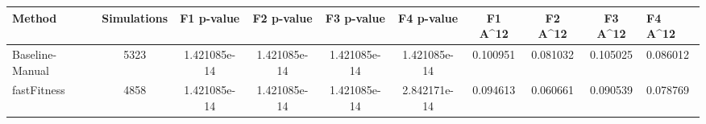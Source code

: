 \begin{tabular}{lcccccccc}
\toprule
         Method &  Simulations &   F1 p-value &   F2 p-value &   F3 p-value &   F4 p-value &  F1 A^12 &  F2 A^12 &  F3 A^12 &  F4 A^12 \\
\midrule
Baseline-Manual &         5323 & 1.421085e-14 & 1.421085e-14 & 1.421085e-14 & 1.421085e-14 & 0.100951 & 0.081032 & 0.105025 & 0.086012 \\
    fastFitness &         4858 & 1.421085e-14 & 1.421085e-14 & 1.421085e-14 & 2.842171e-14 & 0.094613 & 0.060661 & 0.090539 & 0.078769 \\
\bottomrule
\end{tabular}
